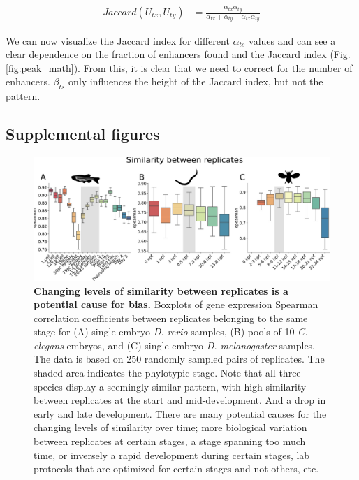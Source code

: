 \begin{align*}
    Jaccard(U_{tx}, U_{ty}) & = \frac{\alpha_{tx} \alpha_{ty}}{\alpha_{tx} + \alpha_{ty} - \alpha_{tx} \alpha_{ty}}
\end{align*}

We can now visualize the Jaccard index for different $\alpha_{ts}$ values and can see a clear dependence on the fraction of enhancers found and the Jaccard index (Fig. \ref{fig:peak_math}). From this, it is clear that we need to correct for the number of enhancers. $\beta_{ts}$ only influences the height of the Jaccard index, but not the pattern.

\subsection{Supplemental figures}
\beginsupplement

\begin{figure}[H]
    \center
    \includegraphics[width=\linewidth]{ch.hourglass/images/within_timepoint.png}
    \caption{\textbf{Changing levels of similarity between replicates is a potential cause for bias.} Boxplots of gene expression Spearman correlation coefficients between replicates belonging to the same stage for (A) single embryo \textit{D. rerio} samples, (B) pools of 10 \textit{C. elegans} embryos, and (C) single-embryo \textit{D. melanogaster} samples. The data is based on 250 randomly sampled pairs of replicates. The shaded area indicates the phylotypic stage. Note that all three species display a seemingly similar pattern, with high similarity between replicates at the start and mid-development. And a drop in early and late development. There are many potential causes for the changing levels of similarity over time; more biological variation between replicates at certain stages, a stage spanning too much time, or inversely a rapid development during certain stages, lab protocols that are optimized for certain stages and not others, etc.}
    \label{fig:within_timepoint}
\end{figure}

